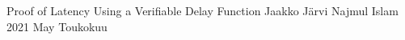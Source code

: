 \documentclass[a4paper,12pt]{report}
\begin{document}

\renewcommand{\appname}{Appendices}

{Proof of Latency Using a Verifiable Delay Function}
{Jaakko Järvi}
{Najmul Islam}
{2021}
{May}
{Toukokuu}


\gentitle


%
%
\pagestyle{empty}


%
%
\tableofcontents
\clearpage
\setcounter{page}{0}
\listoffigures
\clearpage
\setcounter{page}{0}
\lstlistoflistings

%
%
%

\startpages
\end{document}
